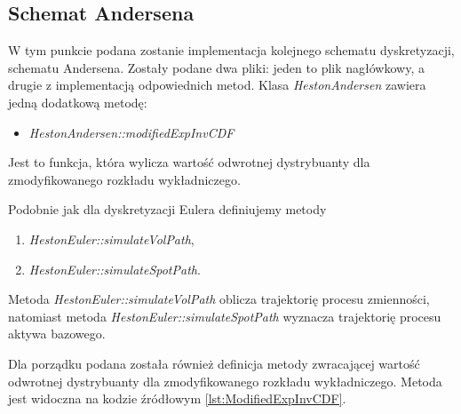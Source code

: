 \documentclass{pracamgr}
\begin{document}
\clearpage
\subsection{Schemat Andersena}
W tym punkcie podana zostanie implementacja kolejnego schematu dyskretyzacji, schematu 
Andersena. Zostały podane dwa
pliki: jeden to plik nagłówkowy, a drugie z implementacją odpowiednich metod.
Klasa \textit{HestonAndersen} zawiera jedną dodatkową 
metodę:
\begin{itemize}
   \item \textit{HestonAndersen::modifiedExpInvCDF}
 \end{itemize} 
Jest to funkcja, która wylicza wartość odwrotnej dystrybuanty dla zmodyfikowanego rozkładu 
wykładniczego.
Podobnie jak dla dyskretyzacji Eulera definiujemy metody 
\begin{enumerate}
  \item \textit{HestonEuler::simulateVolPath},
  \item \textit{HestonEuler::simulateSpotPath}.
\end{enumerate}

Metoda \textit{HestonEuler::simulateVolPath} oblicza trajektorię procesu zmienności, 
natomiast metoda \textit{HestonEuler::simulateSpotPath} wyznacza trajektorię procesu aktywa
bazowego.
Dla porządku podana została również definicja metody zwracającej wartość odwrotnej 
dystrybuanty dla zmodyfikowanego rozkładu wykładniczego. Metoda jest widoczna na kodzie źródłowym 
\ref{lst:ModifiedExpInvCDF}.
\end{document}
